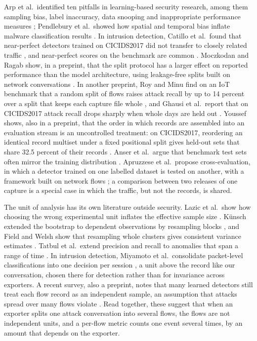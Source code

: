 \documentclass[pdflatex,sn-mathphys-num]{sn-jnl}
\newcommand{\litnum}[1]{#1}
\newcommand{\cicids}{CICIDS2017}
\theoremstyle{thmstyleone}%
\theoremstyle{thmstylethree}%
\begin{document}
Arp et al.\ identified ten pitfalls in learning-based security research, among them sampling bias, label inaccuracy, data snooping and inappropriate performance measures \cite{arp2022}; Pendlebury et al.\ showed how spatial and temporal bias inflate malware classification results \cite{pendlebury2019}. In intrusion detection, Catillo et al.\ found that near-perfect detectors trained on \cicids{} did not transfer to closely related traffic \cite{catillo2022}, and near-perfect scores on the benchmark are common \cite{maseer2021}. Moczkodan and Ragab show, in a preprint, that the split protocol has a larger effect on reported performance than the model architecture, using leakage-free splits built on network conversations \cite{moczkodan2026}. In another preprint, Roy and Minu find on an IoT benchmark that a random split of flows raises attack recall by up to \litnum{14} percent over a split that keeps each capture file whole \cite{roy2026}, and Ghausi et al.\ report that on \cicids{} attack recall drops sharply when whole days are held out \cite{ghausi2026}. Youssef shows, also in a preprint, that the order in which records are assembled into an evaluation stream is an uncontrolled treatment: on \cicids, reordering an identical record multiset under a fixed positional split gives held-out sets that share \litnum{32.5} percent of their records \cite{youssef2026}. Anser et al.\ argue that benchmark test sets often mirror the training distribution \cite{anser2025}. Apruzzese et al.\ propose cross-evaluation, in which a detector trained on one labelled dataset is tested on another, with a framework built on network flows \cite{apruzzese2022}; a comparison between two releases of one capture is a special case in which the traffic, but not the records, is shared.

The unit of analysis has its own literature outside security. Lazic et al.\ show how choosing the wrong experimental unit inflates the effective sample size \cite{lazic2018}. K\"unsch extended the bootstrap to dependent observations by resampling blocks \cite{kunsch1989}, and Field and Welsh show that resampling whole clusters gives consistent variance estimates \cite{field2007}. Tatbul et al.\ extend precision and recall to anomalies that span a range of time \cite{tatbul2018}. In intrusion detection, Miyamoto et al.\ consolidate packet-level classifications into one decision per session \cite{miyamoto2023}, a unit above the record like our conversation, chosen there for detection rather than for invariance across exporters. A recent survey, also a preprint, notes that many learned detectors still treat each flow record as an independent sample, an assumption that attacks spread over many flows violate \cite{elmahdaouy2026}. Read together, these suggest that when an exporter splits one attack conversation into several flows, the flows are not independent units, and a per-flow metric counts one event several times, by an amount that depends on the exporter.
\end{document}

